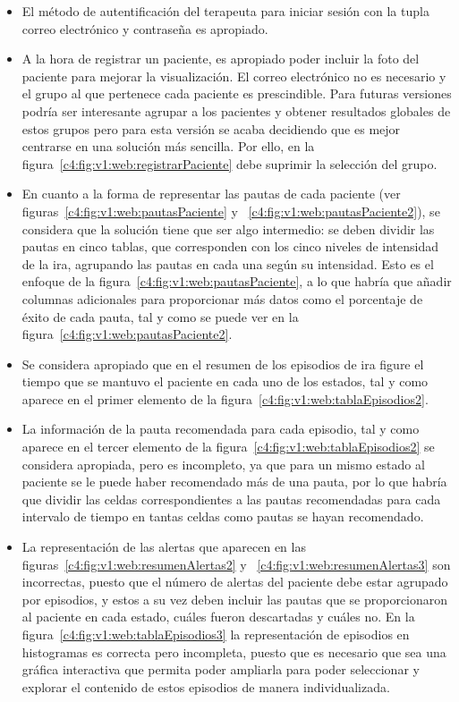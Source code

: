 \begin{itemize}
    \item El método de autentificación del terapeuta para iniciar sesión con la tupla correo electrónico y contraseña es apropiado.
    \item A la hora de registrar un paciente, es apropiado poder incluir la foto del paciente para mejorar la visualización. El correo electrónico no es necesario y el grupo al que pertenece cada paciente es prescindible. Para futuras versiones podría ser interesante agrupar a los pacientes y obtener resultados globales de estos grupos pero para esta versión se acaba decidiendo que es mejor centrarse en una solución más sencilla. Por ello, en la figura~\ref{c4:fig:v1:web:registrarPaciente} debe suprimir la selección del grupo.
    \item En cuanto a la forma de representar las pautas de cada paciente (ver figuras~\ref{c4:fig:v1:web:pautasPaciente} y ~\ref{c4:fig:v1:web:pautasPaciente2}), se considera que la solución tiene que ser algo intermedio: se deben dividir las pautas en cinco tablas, que corresponden con los cinco niveles de intensidad de la ira, agrupando las pautas en cada una según su intensidad. Esto es el enfoque de la figura~\ref{c4:fig:v1:web:pautasPaciente}, a lo que habría que añadir columnas adicionales para proporcionar más datos como el porcentaje de éxito de cada pauta, tal y como se puede ver en la figura~\ref{c4:fig:v1:web:pautasPaciente2}.
    \item Se considera apropiado que en el resumen de los episodios de ira figure el tiempo que se mantuvo el paciente en cada uno de los estados, tal y como aparece en el primer elemento de la figura~\ref{c4:fig:v1:web:tablaEpisodios2}.
    \item La información de la pauta recomendada para cada episodio, tal y como aparece en el tercer elemento de la figura~\ref{c4:fig:v1:web:tablaEpisodios2} se considera apropiada, pero es incompleto, ya que para un mismo estado al paciente se le puede haber recomendado más de una pauta, por lo que habría que dividir las celdas correspondientes a las pautas recomendadas para cada intervalo de tiempo en tantas celdas como pautas se hayan recomendado.
    
    \item La representación de las alertas que aparecen en las figuras~\ref{c4:fig:v1:web:resumenAlertas2} y ~\ref{c4:fig:v1:web:resumenAlertas3} son incorrectas, puesto que el número de alertas del paciente debe estar agrupado por episodios, y estos a su vez deben incluir las pautas que se proporcionaron al paciente en cada estado, cuáles fueron descartadas y cuáles no. En la figura~\ref{c4:fig:v1:web:tablaEpisodios3} la representación de episodios en histogramas es correcta pero incompleta, puesto que es necesario que sea una gráfica interactiva que permita poder ampliarla para poder seleccionar y explorar el contenido de estos episodios de manera individualizada.
    

\end{itemize}
